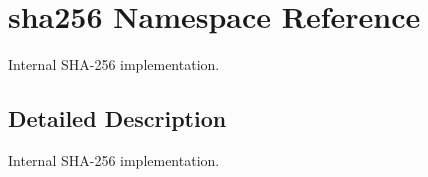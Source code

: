 \hypertarget{namespacesha256}{}\section{sha256 Namespace Reference}
\label{namespacesha256}


Internal S\+H\+A-\/256 implementation.  




\subsection{Detailed Description}
Internal S\+H\+A-\/256 implementation. 